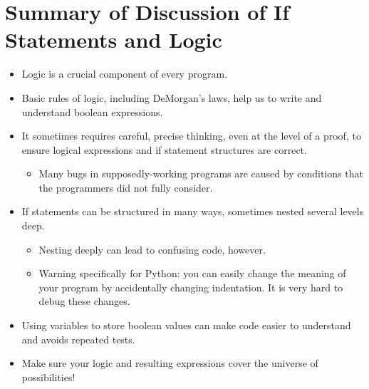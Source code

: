 \documentclass[letterpaper,10pt,english]{sphinxmanual}
\begin{document}
\section{Summary of Discussion of If Statements and Logic}
\label{\detokenize{lecture_notes/lec11_conditionals2:summary-of-discussion-of-if-statements-and-logic}}\begin{itemize}
\item {} 
Logic is a crucial component of every program.

\item {} 
Basic rules of logic, including DeMorgan’s laws, help us to write and
understand boolean expressions.

\item {} 
It sometimes requires careful, precise thinking, even at the level of
a proof, to ensure logical expressions and if statement structures
are correct.
\begin{itemize}
\item {} 
Many bugs in supposedly-working programs are caused by conditions
that the programmers did not fully consider.

\end{itemize}

\item {} 
If statements can be structured in many ways, sometimes nested several
levels deep.
\begin{itemize}
\item {} 
Nesting deeply can lead to confusing code, however.

\item {} 
Warning specifically for Python: you can easily change the meaning of
your program by accidentally changing indentation. It is very
hard to debug these changes.

\end{itemize}

\item {} 
Using variables to store boolean values can make code easier to
understand and avoids repeated tests.

\item {} 
Make sure your logic and resulting expressions cover the universe of
possibilities!

\end{itemize}
\end{document}
